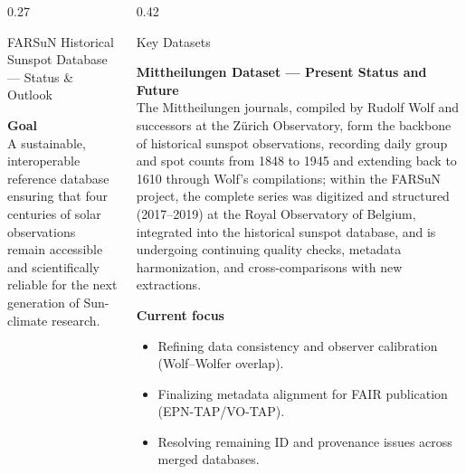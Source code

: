 \documentclass[final]{beamer}
\newenvironment{tightblock}[1]{%
  \begin{block}{#1}\vspace{0.35em}
}{\end{block}}
\begin{document}
\begin{frame}[t]
\begin{columns}[t,totalwidth=0.98\paperwidth]
\begin{column}{0.27\paperwidth}
\begin{tightblock}{FARSuN Historical Sunspot Database — Status \& Outlook}
  \textbf{Goal}\\
  A sustainable, interoperable reference database ensuring that four centuries of solar observations remain accessible and scientifically reliable for the next generation of Sun-climate research.
\end{tightblock}
\end{column}


\begin{column}{0.42\paperwidth}
\begin{tightblock}{Key Datasets}
\textbf{Mittheilungen Dataset — Present Status and Future}\\
The Mittheilungen journals, compiled by Rudolf Wolf and successors at the Zürich Observatory, form the backbone of historical sunspot observations, recording daily group and spot counts from 1848 to 1945 and extending back to 1610 through Wolf's compilations; within the FARSuN project, the complete series was digitized and structured (2017--2019) at the Royal Observatory of Belgium, integrated into the historical sunspot database, and is undergoing continuing quality checks, metadata harmonization, and cross-comparisons with new extractions.

\textbf{Current focus}
\begin{itemize}
  \item Refining data consistency and observer calibration (Wolf--Wolfer overlap).
  \item Finalizing metadata alignment for FAIR publication (EPN-TAP/VO-TAP).
  \item Resolving remaining ID and provenance issues across merged databases.
\end{itemize}


\end{tightblock}
\end{column}
\end{columns}
\end{frame}
\end{document}
